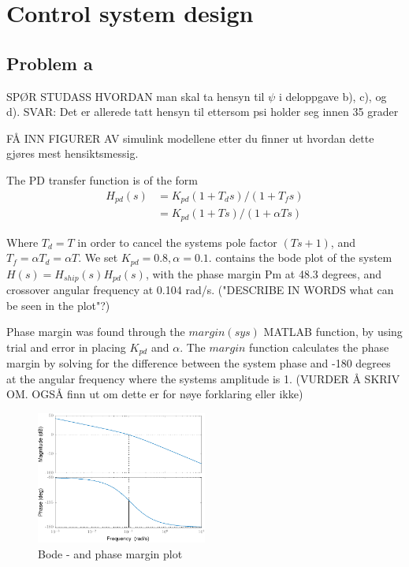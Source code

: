 \section{Control system design}

\subsection{Problem a}

SPØR STUDASS HVORDAN man skal ta hensyn til $\psi$ i deloppgave b), c), og d). SVAR: Det er allerede tatt hensyn til ettersom psi holder seg innen 35 grader

FÅ INN FIGURER AV simulink modellene etter du finner ut hvordan dette gjøres mest hensiktsmessig.

The PD transfer function is of the form
\begin{align*}
    H_{pd}(s) &= K_{pd}(1+T_d s)/(1+T_f s) \\
              &= K_{pd}(1+T s)/(1+\alpha T s)
\end{align*}

Where $T_d = T$ in order to cancel the systems pole factor $(Ts + 1)$, and $T_f = \alpha T_d = \alpha T$. We set $K_{pd} = 0.8, \alpha = 0.1$.  contains the bode plot of the system $H(s) = H_{ship}(s)H_{pd}(s)$, with the phase margin Pm at 48.3 degrees, and crossover angular frequency at 0.104 rad/s. ("DESCRIBE IN WORDS what can be seen in the plot"?)

Phase margin was found through the $margin(sys)$ MATLAB function, by using trial and error in placing $K_{pd}$ and $\alpha$. The $margin$ function calculates the phase margin by solving for the difference between the system phase and -180 degrees at the angular frequency where the systems amplitude is 1. (VURDER Å SKRIV OM. OGSÅ finn ut om dette er for nøye forklaring eller ikke)

\begin{figure}[ht]
    \centering
    \includegraphics[width=0.5\textwidth]{images/3a-bode_and_phasemargin}
    \caption{Bode - and phase margin plot}
    \label{fig:3a-bode_and_phasemargin}
\end{figure}


